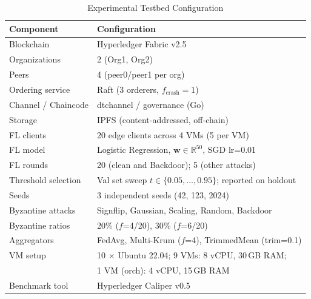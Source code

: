\begin{table}[!t]
\renewcommand{\arraystretch}{1.2}
\caption{Experimental Testbed Configuration}
\label{tab:setup}
\centering
\begin{tabular}{ll}
\hline
\textbf{Component} & \textbf{Configuration} \\
\hline
Blockchain & Hyperledger Fabric v2.5 \\
Organizations & 2 (Org1, Org2) \\
Peers & 4 (peer0/peer1 per org) \\
Ordering service & Raft (3 orderers, $f_{\text{crash}}=1$) \\
Channel / Chaincode & dtchannel / governance (Go) \\
Storage & IPFS (content-addressed, off-chain) \\
FL clients & 20 edge clients across 4 VMs (5 per VM) \\
FL model & Logistic Regression, $\mathbf{w}\in\mathbb{R}^{50}$, SGD lr=0.01 \\
FL rounds & 20 (clean and Backdoor); 5 (other attacks) \\
Threshold selection & Val set sweep $t\in\{0.05,\ldots,0.95\}$; reported on holdout \\
Seeds & 3 independent seeds (42, 123, 2024) \\
Byzantine attacks & Signflip, Gaussian, Scaling, Random, Backdoor \\
Byzantine ratios & 20\% ($f$=4/20), 30\% ($f$=6/20) \\
Aggregators & FedAvg, Multi-Krum ($f$=4), TrimmedMean (trim=0.1) \\
VM setup & 10 $\times$ Ubuntu 22.04; 9 VMs: 8 vCPU, 30\,GB RAM; \\
         & 1 VM (orch): 4 vCPU, 15\,GB RAM \\
Benchmark tool & Hyperledger Caliper v0.5 \\
\hline
\end{tabular}
\end{table}
